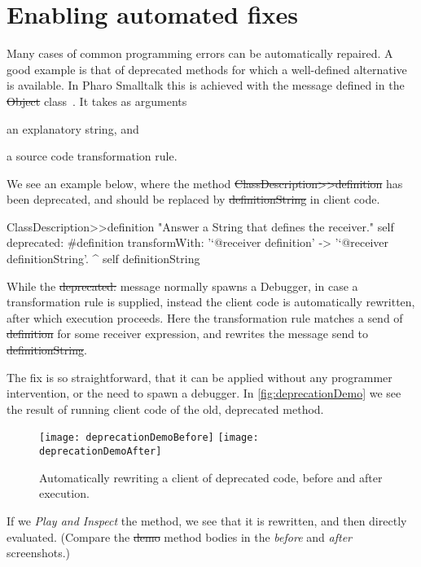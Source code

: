 \documentclass[sigplan,anonymous,review,10pt]{acmart}
\begin{document}
\section{Enabling automated fixes}\label{sec:fixes}

Many cases of common programming errors can be automatically repaired.
A good example is that of deprecated methods for which a well-defined alternative is available.
In Pharo Smalltalk this is achieved with the  message defined in the \st{Object} class~\cite{Duca22a}.
It takes as arguments
\begin{inparaenum}[(i)]
	\item an explanatory string, and
	\item a source code transformation rule.
\end{inparaenum}    
We see an example below, where the method \st{ClassDescription>>definition} has been deprecated, and should be replaced by \st{definitionString} in client code.
\begin{code}
ClassDescription>>definition
	"Answer a String that defines the receiver."
	self
		deprecated: #definition
		transformWith: '`@receiver definition' -> '`@receiver definitionString'.
	^ self definitionString
\end{code}
While the \st{deprecated:} message normally spawns a Debugger, in case a transformation rule is supplied, instead the client code is automatically rewritten, after which execution proceeds.
Here the transformation rule matches a send of \st{definition} for some receiver expression, and rewrites the message send to \st{definitionString}.

The fix is so straightforward, that it can be applied without any programmer intervention, or the need to spawn a debugger.
In \autoref{fig:deprecationDemo} we see the result of running client code of the old, deprecated method.
\begin{figure}[h]
  \texttt{[image: deprecationDemoBefore]}
  \texttt{[image: deprecationDemoAfter]}
  \caption{Automatically rewriting a client of deprecated code, before and after execution.}
  \label{fig:deprecationDemo}
\end{figure}
If we \emph{Play and Inspect} the method, we see that it is rewritten, and then directly evaluated.
(Compare the \st{demo} method bodies in the \emph{before} and \emph{after} screenshots.)
\end{document}
